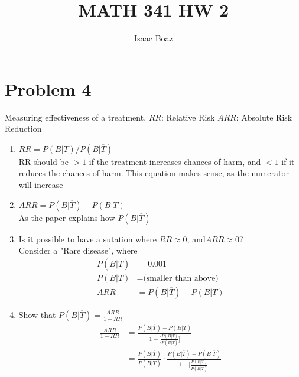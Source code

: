 \documentclass{article}
\title{\vspace{-5ex}MATH 341 HW 2}
\author{Isaac Boaz}
\begin{document}
\maketitle

\section*{Problem 4}
Measuring effectiveness of a treatment.
\(RR\): Relative Risk
\(ARR\): Absolute Risk Reduction

\begin{enumerate}[label=\alph*)]
    \item \(RR = P(B \vert T) / P(B \vert \overline{T})\) \\
    RR should be \(> 1\) if the treatment increases chances of harm, and \(< 1\) if it reduces the chances of harm.
    This equation makes sense, as the numerator will increase 
    \item \(ARR = P(B \vert \overline{T}) - P(B \vert T)\) \\
    As the paper explains how \(P(B \vert \overline{T})\) 
    \item Is it possible to have a sutation where \(RR \approx 0 \text{, and} ARR \approx 0\)? \\
    Consider a "Rare disease", where
    \begin{align*}
        P(B \vert \overline{T}) &= 0.001 \\
        P(B \vert T) &= \text{(smaller than above)} \\
        ARR &= P(B \vert \overline{T}) - P(B \vert T)
    \end{align*}
    \item Show that \(P(B \vert \overline{T}) = \frac{ARR}{1-RR}\)
    \begin{align*}
        \frac{
            ARR
        }{
            1-RR
        } &= 
        \frac{
            P(B \vert \overline{T}) - P(B \vert T)
        }
        {
            1 - \lbrack 
                \frac{
                    P (B \vert T)
                }{
                    P(B \vert \overline{T})
                } \rbrack
        } \\
        &=
        \frac{
            P(B \vert \overline{T})
        }
        {
            P(B \vert \overline{T})
        } \cdot
        \frac{
            P(B \vert \overline{T}) - P(B \vert \overline{T})
        }
        {
            1 - \lbrack \frac{
                P (B \vert T)
                }
                {
                    P (B \vert \overline{T})
                } \rbrack
        }
    \end{align*}
\end{enumerate}
\end{document}
